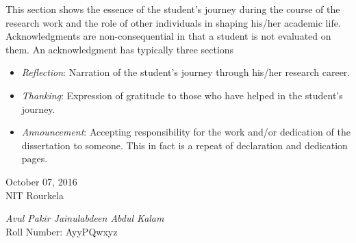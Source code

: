 \thispagestyle{empty} 
\noindent This section shows the essence of the student's journey during the course of the research work and the role of other individuals in shaping his/her academic life.
Acknowledgments are non-consequential in that a student is not evaluated on them. An acknowledgment has typically three sections \textemdash
\begin{itemize}
\item \textit{Reflection}: Narration of the student's journey through his/her research career.
\item \textit{Thanking}: Expression of gratitude to those who have helped in the student's journey.
\item \textit{Announcement}: Accepting responsibility for the work and/or dedication of the dissertation to someone. This in fact is a repeat of declaration and dedication pages.
\end{itemize}

\vspace{15mm}
\begin{minipage}{.45\linewidth}
\begin{flushleft}
October 07, 2016\\
NIT Rourkela
\end{flushleft}
\end{minipage}
\begin{minipage}{.45\linewidth}
\begin{flushright}
\textit{Avul Pakir Jainulabdeen Abdul Kalam}\\
Roll Number: AyyPQwxyz
\end{flushright}
\end{minipage}